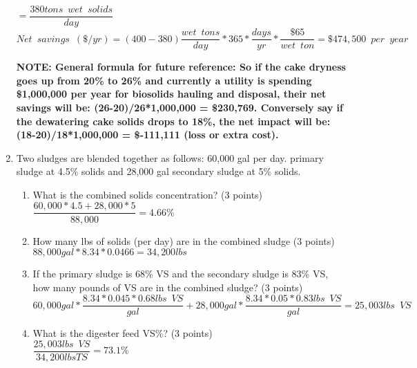 \begin{enumerate}
\vspace{3mm}
$=\dfrac{380 tons \enspace  wet \enspace solids}{day}$\\
\vspace{3mm}
$Net \enspace savings \enspace (\$/yr) = (400 - 380)\dfrac{wet \enspace tons}{day}*365*\dfrac{days}{yr}*\dfrac{\$65}{wet \enspace ton}=\boxed{\$474,500 \enspace per \enspace year}$


\textbf {NOTE:  General formula for future reference: So if the cake dryness goes up from 20\% to 26\% and currently a utility is spending \$1,000,000 per year for biosolids hauling and disposal, their net savings will be: (26-20)/26*1,000,000 = \$230,769.  Conversely say if the dewatering cake solids drops to 18\%, the net impact will be: (18-20)/18*1,000,000 = \$-111,111 (loss or extra cost).}
\\

\item Two sludges are blended together as follows: 60,000 gal per day. primary sludge at 4.5\% solids and 28,000 gal secondary sludge at 5\% solids. 
\begin{enumerate}
\item What is the combined solids concentration?  (3 points)\\

$\dfrac{60,000*4.5+28,000*5}{88,000}=\boxed{4.66\%}$\\
\vspace{0.25cm}
\item How many lbs of solids (per day) are in the combined sludge (3 points)\\

$88,000 gal*8.34*0.0466 = \boxed{34,200 lbs}$\\
\vspace{0.25cm}


\item If the primary sludge is 68\% VS and the secondary sludge is 83\% VS, how many pounds of VS are in the combined sludge? (3 points)\\
$60,000 gal *\dfrac{8.34*0.045*0.68lbs \enspace VS}{gal}+28,000 gal *\dfrac{8.34*0.05*0.83lbs \enspace VS}{gal}=\boxed{25,003 lbs \enspace VS}$
\vspace{2cm}

\item What is the digester feed VS\%?  (3 points)\\
$\dfrac{25,003 lbs \enspace VS}{34,200 lbs TS}=\boxed{73.1\%}$
\vspace{0.25cm}


\end{enumerate}
\end{enumerate}
